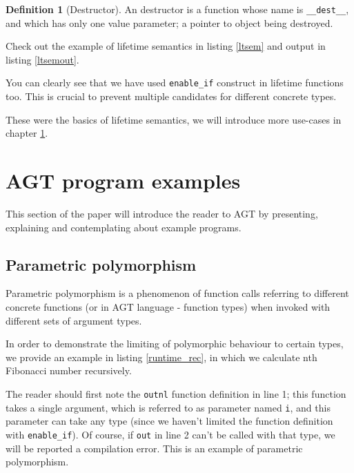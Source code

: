 \documentclass[times, utf8, diplomski]{fer}
\theoremstyle{definition}
\newtheorem{definition}{Definition}[]
\newcommand{\textcode}[3]{
    
}
\begin{document}
\begin{definition}[Destructor]
An destructor is a function whose name is \texttt{\_\_dest\_\_}, and which has only one value parameter;
a pointer to object being destroyed.
\end{definition}

Check out the example of lifetime semantics in listing \ref{ltsem} and output in listing \ref{ltsemout}.

\textcode{\resdir/compiler/lifetime_ex.agt}{ltsem}{Lifetime semantics}
\textcode{\resdir/compiler/lifetime_ex.out}{ltsemout}{Lifetime semantics - output}

You can clearly see that we have used \texttt{enable\_if} construct in lifetime functions too.
This is crucial to prevent multiple candidates for different concrete types.

These were the basics of lifetime semantics, we will introduce more use-cases
in chapter \ref{chap:examples}.




\chapter{AGT program examples}\label{chap:examples}

This section of the paper will introduce the reader to AGT by presenting, explaining and contemplating
about example programs.

\section{Parametric polymorphism}

Parametric polymorphism is a phenomenon of function calls referring to different concrete functions 
(or in AGT language - function types) when invoked with different sets of argument types.

In order to demonstrate the limiting of polymorphic behaviour to certain types, we provide
an example in listing \ref{runtime_rec}, in which we calculate nth Fibonacci number recursively.

\textcode{\resdir/programs/fib_runtime_recursion.agt}{runtime_rec}
{Fibonacci with recursion, Parametric Polymorphism}

The reader should first note the \texttt{outnl} function definition in line 1;
this function takes a single argument, which is referred to as parameter named \texttt{i},
and this parameter can take any type (since we haven't limited the function definition 
with \texttt{enable\_if}).
Of course, if \texttt{out} in line 2 can't be called with that type, we will be
reported a compilation error. This is an example of parametric polymorphism.
\end{document}
